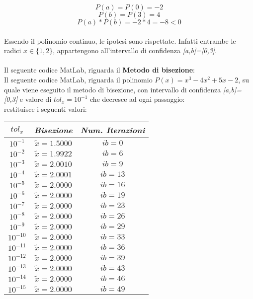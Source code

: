 	\[
	P(a) = P(0) = -2
	\]
	\[
	P(b) = P(3) = 4
	\]
	\[
	P(a)*P(b) = -2 * 4 = -8 < 0
	\]\\
Essendo il polinomio continuo, le ipotesi sono rispettate. Infatti entrambe le radici $x \in \{1,2\}$, appartengono all'intervallo di confidenza \textit{[a,b]=[0,3]}.\\\\
Il seguente codice MatLab, riguarda il \textbf{Metodo di bisezione}:\\
	
Il seguente codice MatLab, riguarda il polinomio $P(x) = x^3-4x^2+5x-2$, su quale viene eseguito il metodo di bisezione, con intervallo di confidenza \textit{[a,b]=[0,3]} e valore di $tol_x=10^{-1}$ che decresce ad ogni passaggio:\\
	
restituisce i seguenti valori:\\
\begin{center}
	\begin{tabular}{|c|c|c|}
		\hline
			$tol_x$ & \textit{Bisezione} & \textit{Num. Iterazioni} \\
		\hline
   			$10^{-1}$ & $\tilde{x} = 1.5000$ & $ib = 0$\\
    		$10^{-2}$ & $\tilde{x} = 1.9922$ & $ib = 6$\\
    		$10^{-3}$ & $\tilde{x} = 2.0010$ & $ib = 9$\\
    		$10^{-4}$ & $\tilde{x} = 2.0001$ & $ib = 13$\\
   			$10^{-5}$ & $\tilde{x} = 2.0000$ & $ib = 16$\\
   			$10^{-6}$ & $\tilde{x} = 2.0000$ & $ib = 19$\\
    		$10^{-7}$ & $\tilde{x} = 2.0000$ & $ib = 23$\\
    		$10^{-8}$ & $\tilde{x} = 2.0000$ & $ib = 26$\\
    		$10^{-9}$ & $\tilde{x} = 2.0000$ & $ib= 29$\\
    		$10^{-10}$ & $\tilde{x} = 2.0000$ & $ib = 33$\\
    		$10^{-11}$ & $\tilde{x} = 2.0000$ & $ib = 36$\\
    		$10^{-12}$ & $\tilde{x} = 2.0000$ & $ib = 39$\\
    		$10^{-13}$ & $\tilde{x} = 2.0000$ & $ib = 43$\\
    		$10^{-14}$ & $\tilde{x} = 2.0000$ & $ib = 46$\\
    		$10^{-15}$ & $\tilde{x} = 2.0000$ & $ib = 49$\\
		\hline
	\end{tabular}
\end{center}